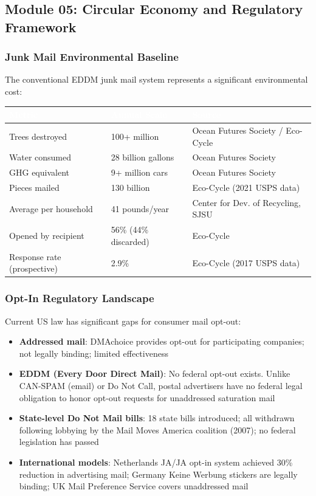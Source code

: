 \documentclass[11pt,letterpaper]{article}
\newcommand{\tableheader}[1]{\textbf{\sffamily\textcolor{white}{#1}}}
\begin{document}
\subsection{Module 05: Circular Economy and Regulatory Framework}

\subsubsection{Junk Mail Environmental Baseline}
The conventional EDDM junk mail system represents a significant environmental cost:

\begin{center}
\begin{tabularx}{\textwidth}{L{4cm}C{3cm}X}
\toprule
{}
\tableheader{Metric} & \tableheader{Annual Scale} & \tableheader{Source} \\
\midrule
Trees destroyed & 100+ million & Ocean Futures Society / Eco-Cycle \\
Water consumed & 28 billion gallons & Ocean Futures Society \\
GHG equivalent & 9+ million cars & Ocean Futures Society \\
Pieces mailed & 130 billion & Eco-Cycle (2021 USPS data) \\
Average per household & 41 pounds/year & Center for Dev. of Recycling, SJSU \\
Opened by recipient & 56\% (44\% discarded) & Eco-Cycle \\
Response rate (prospective) & 2.9\% & Eco-Cycle (2017 USPS data) \\
\bottomrule
\end{tabularx}
\end{center}

\subsubsection{Opt-In Regulatory Landscape}
Current US law has significant gaps for consumer mail opt-out:
\begin{itemize}[leftmargin=1.5em]
  \item \textbf{Addressed mail}: DMAchoice provides opt-out for participating companies; not legally binding; limited effectiveness
  \item \textbf{EDDM (Every Door Direct Mail)}: No federal opt-out exists. Unlike CAN-SPAM (email) or Do Not Call, postal advertisers have no federal legal obligation to honor opt-out requests for unaddressed saturation mail
  \item \textbf{State-level Do Not Mail bills}: 18 state bills introduced; all withdrawn following lobbying by the Mail Moves America coalition (2007); no federal legislation has passed
  \item \textbf{International models}: Netherlands JA/JA opt-in system achieved 30\% reduction in advertising mail; Germany Keine Werbung stickers are legally binding; UK Mail Preference Service covers unaddressed mail
\end{itemize}
\end{document}
